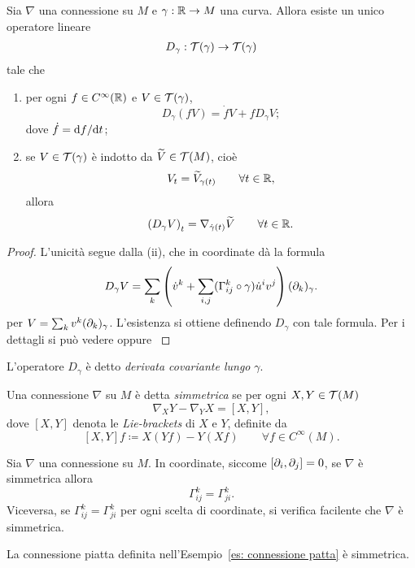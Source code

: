 	\begin{lemma}
		Sia \(\nabla\) una connessione su \(M\) e \(\gamma:\mathbb{R} \to M\) una curva. Allora esiste un unico operatore lineare
		\begin{align*}
			D_\gamma: \mathcal{T}(\gamma) \to \mathcal{T}(\gamma)
		\end{align*}
		tale che
		\begin{enumerate}[label=(\roman*)]
			\item per ogni \(f \in C^\infty(\mathbb{R})\) e \(V \in \mathcal{T}(\gamma)\),
			\[
			D_\gamma (fV) =\dot f V + fD_\gamma V;
			\]
			dove \(\dot f = \mathrm{d} f / \mathrm{d} t\);
			\item se \(V \in \mathcal{T}(\gamma)\) è indotto da \(\widetilde{V} \in \mathcal{T}(M)\), cioè 
			\[
			V_t = \widetilde{V}_{\gamma(t)} \qquad \forall t \in \mathbb{R},
			\]
			allora
			\[
			\left(D_\gamma V\right)_t = \nabla_{\dot{\gamma}(t)}\widetilde{V} \qquad \forall t \in \mathbb{R}.
			\]
		\end{enumerate}
	\end{lemma}
	\begin{proof} L'unicità segue dalla (ii), che in coordinate dà la formula 
		\begin{equation*}
			D_\gamma V = \sum_k \left(\dot v^k + \sum_{i,j}(\Gamma_{ij}^k \circ \gamma) \dot u^i v^j \right) (\partial_k)_{\gamma}.
		\end{equation*}
		per \(V = \sum_k v^k (\partial_k)_\gamma\). L'esistenza si ottiene definendo \(D_\gamma\) con tale formula. Per i dettagli si può vedere \cite[Lemma~8.1]{milnor1963morse} oppure \cite[Proposizione~6.1.12]{abate2011geometria}
	\end{proof}
	
	\begin{defi}
		L'operatore \(D_\gamma\) è detto \textit{derivata covariante lungo} \(\gamma\). 
	\end{defi}
	
	\begin{defi}
		Una connessione \(\nabla\) su \(M\) è detta \textit{simmetrica} se per ogni \(X,Y \in \mathcal{T}(M)\)
		\[
		\nabla_X Y - \nabla_YX = [X,Y],
		\]
		dove \([X,Y]\) denota le \textit{Lie-brackets} di \(X\) e \(Y\), definite da
		\[
		[X,Y] f \coloneq X(Yf) - Y(Xf) \qquad \forall f \in C^\infty(M).
		\]
	\end{defi}
	\begin{oss}
		Sia \(\nabla\) una connessione su \(M\). In coordinate, siccome \([\partial_i,\partial_j]=0\), se \(\nabla\) è simmetrica allora
		\[
		\Gamma_{ij}^k= \Gamma_{ji}^k.
		\]
		Viceversa, se \(\Gamma_{ij}^k = \Gamma_{ji}^k\) per ogni scelta di coordinate, si verifica facilente che \(\nabla\) è simmetrica.
	\end{oss}
	\begin{es}
		La connessione piatta definita nell'Esempio~\ref{es: connessione patta} è simmetrica. 
	\end{es}
	

